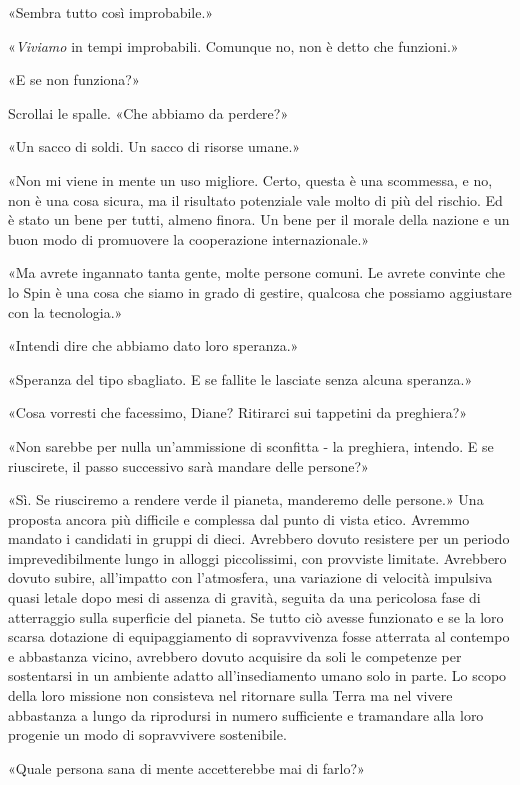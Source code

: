 «Sembra tutto così improbabile.»

«\emph{Viviamo} in tempi improbabili. Comunque no, non è detto che
funzioni.»

«E se non funziona?»

Scrollai le spalle. «Che abbiamo da perdere?»

«Un sacco di soldi. Un sacco di risorse umane.»

«Non mi viene in mente un uso migliore. Certo, questa è una scommessa, e
no, non è una cosa sicura, ma il risultato potenziale vale molto di più
del rischio. Ed è stato un bene per tutti, almeno finora. Un bene per il
morale della nazione e un buon modo di promuovere la cooperazione
internazionale.»

«Ma avrete ingannato tanta gente, molte persone comuni. Le avrete
convinte che lo Spin è una cosa che siamo in grado di gestire, qualcosa
che possiamo aggiustare con la tecnologia.»

«Intendi dire che abbiamo dato loro speranza.»

«Speranza del tipo sbagliato. E se fallite le lasciate senza alcuna
speranza.»

«Cosa vorresti che facessimo, Diane? Ritirarci sui tappetini da
preghiera?»

«Non sarebbe per nulla un'ammissione di sconfitta - la preghiera,
intendo. E se riuscirete, il passo successivo sarà mandare delle
persone?»

«Sì. Se riusciremo a rendere verde il pianeta, manderemo delle persone.»
Una proposta ancora più difficile e complessa dal punto di vista etico.
Avremmo mandato i candidati in gruppi di dieci. Avrebbero dovuto
resistere per un periodo imprevedibilmente lungo in alloggi
piccolissimi, con provviste limitate. Avrebbero dovuto subire,
all'impatto con l'atmosfera, una variazione di velocità impulsiva quasi
letale dopo mesi di assenza di gravità, seguita da una pericolosa fase
di atterraggio sulla superficie del pianeta. Se tutto ciò avesse
funzionato e se la loro scarsa dotazione di equipaggiamento di
sopravvivenza fosse atterrata al contempo e abbastanza vicino, avrebbero
dovuto acquisire da soli le competenze per sostentarsi in un ambiente
adatto all'insediamento umano solo in parte. Lo scopo della loro
missione non consisteva nel ritornare sulla Terra ma nel vivere
abbastanza a lungo da riprodursi in numero sufficiente e tramandare alla
loro progenie un modo di sopravvivere sostenibile.

«Quale persona sana di mente accetterebbe mai di farlo?»

